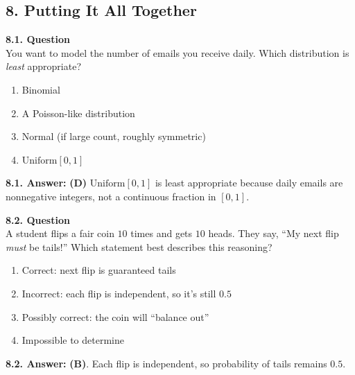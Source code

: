 \documentclass[12pt]{article}
\begin{document}
\subsection*{8. Putting It All Together}

\textbf{8.1. Question}\\
You want to model the number of emails you receive daily. Which distribution is \emph{least} appropriate?
\begin{enumerate}[label=\Alph*.]
\item Binomial
\item A Poisson-like distribution
\item Normal (if large count, roughly symmetric)
\item $\mathrm{Uniform}[0,1]$
\end{enumerate}

\noindent
\textbf{8.1. Answer:} \textbf{(D)} $\mathrm{Uniform}[0,1]$ is least appropriate because daily emails are nonnegative integers, not a continuous fraction in $[0,1]$.

\bigskip

\textbf{8.2. Question}\\
A student flips a fair coin $10$ times and gets $10$ heads. They say, ``My next flip \textit{must} be tails!'' Which statement best describes this reasoning?
\begin{enumerate}[label=\Alph*.]
\item Correct: next flip is guaranteed tails
\item Incorrect: each flip is independent, so it's still $0.5$
\item Possibly correct: the coin will ``balance out''
\item Impossible to determine
\end{enumerate}

\noindent
\textbf{8.2. Answer:} \textbf{(B)}. Each flip is independent, so probability of tails remains $0.5.$
\end{document}
